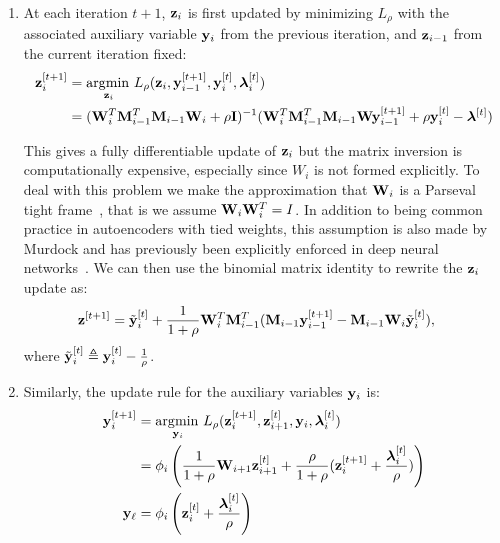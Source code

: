 \begin{enumerate}
\item
 At each iteration $t+1$, $\mathbf{z}_i$ is first updated by minimizing $L_\rho$ with the associated auxiliary variable $\mathbf{y}_i$ from the previous iteration, and $\mathbf{z}_{i-1}$ from the current iteration fixed:
  \begin{equation}
    \begin{aligned}
      \mathbf{z}^{[t+1]}_i & = \operatorname*{\arg\!\min\,}_{\mathbf{z}_i} L_\rho(\mathbf{z}_i, \mathbf{y}^{[t+1]}_{i-1}, \mathbf{y}^{[t]}_i, \bm{\lambda}_i^{[t]})\\
      &= (\mathbf{W}_i^T\mathbf{M}_{i-1}^T\mathbf{M}_{i-1}\mathbf{W}_i + \rho \mathbf{I})^{-1}(\mathbf{W}_{i}^T\mathbf{M}_{i-1}^T\mathbf{M}_{i-1}\mathbf{W}\mathbf{y}^{[t+1]}_{i-1} + \rho \mathbf{y}^{[t]}_{i} - \bm{\lambda}^{[t]})
    \end{aligned}
    \label{eq:wupdate1}  
  \end{equation}

  This gives a fully differentiable update of $\mathbf{z}_i$ but the matrix inversion is computationally expensive, especially since $W_i$ is not formed explicitly. To deal with this problem we make the approximation that $\mathbf{W}_i$ is a Parseval tight frame~\cite{}, that is we assume $\mathbf{W}_i\mathbf{W}_i^T = I$. In addition to being common practice in autoencoders with tied weights, this assumption is also made by Murdock \etal and has previously been explicitly enforced in deep neural networks~\cite{}. We can then use the binomial matrix identity to rewrite the $\mathbf{z}_i$ update as:
  \begin{equation}
    \begin{aligned}
      \mathbf{z}^{[t+1]} &= \tilde{\mathbf{y}}_i^{[t]} + \frac{1}{1 + \rho}\mathbf{W}^T_i\mathbf{M}_{i-1}^T(\mathbf{M}_{i-1}\mathbf{y}^{[t+1]}_{i-1} - \mathbf{M}_{i-1}\mathbf{W}_i\tilde{\mathbf{y}}^{[t]}_i),
    \end{aligned}\label{eq:zupdate}
  \end{equation}
  where $\tilde{\mathbf{y}}_i^{[t]} \triangleq \mathbf{y}_i^{[t]} - \frac{1}{\rho}$.
\item
 Similarly, the update rule for the auxiliary variables $\mathbf{y}_i$ is:
  \begin{equation}
    \begin{aligned}
      \mathbf{y}_i^{[t+1]} & = \operatorname*{\arg\!\min\,}_{\mathbf{y}_i} L_\rho(\mathbf{z}^{[t+1]}_i, \mathbf{z}^{[t]}_{i+1}, \mathbf{y}_i, \bm{\lambda}_i^{[t]})\\
      &= \phi_i\left(\frac{1}{1+\rho}\mathbf{W}_{i+1}\mathbf{z}^{[t]}_{i+1} + \frac{\rho}{1+\rho}(\mathbf{z}^{[t+1]}_i + \frac{\bm{\lambda}_i^{[t]}}{\rho})\right)\\
      \mathbf{y}_{\ell} &= \phi_i\left(\mathbf{z}_i^{[t]} + \frac{\bm{\lambda}_i^{[t]}}{\rho}\right)
    \end{aligned}\label{eq:yupdate}
  \end{equation}


\end{enumerate}
